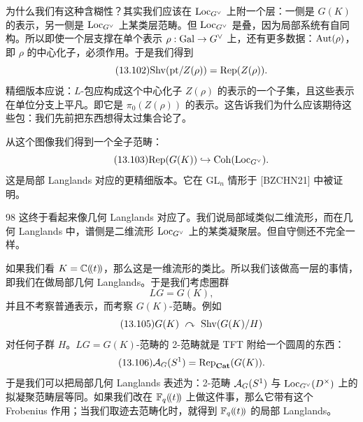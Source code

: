 为什么我们有这种含糊性？其实我们应该在 $\mathrm{Loc}_{G^\vee}$ 上附一个层：一侧是 $G(K)$ 的表示，另一侧是 $\mathrm{Loc}_{G^\vee}$ 上某类层范畴。但 $\mathrm{Loc}_{G^\vee}$ 是叠，因为局部系统有自同构。所以即使一个层支撑在单个表示 $\rho:\mathrm{Gal}\to G^\vee$ 上，还有更多数据：$\mathrm{Aut}(\rho)$，即 $\rho$ 的中心化子，必须作用。于是我们得到
\begin{equation}\tag{13.102}
\mathrm{Shv}(\mathrm{pt}/Z(\rho))=\mathrm{Rep}(Z(\rho)).
\end{equation}
精细版本应说：$L$-包应构成这个中心化子 $Z(\rho)$ 的表示的一个子集，且这些表示在单位分支上平凡。即它是 $\pi_0(Z(\rho))$ 的表示。这告诉我们为什么应该期待这些包：我们先前把东西想得太过集合论了。

从这个图像我们得到一个全子范畴：
\begin{equation}\tag{13.103}
\mathrm{Rep}(G(K))\hookrightarrow \mathrm{Coh}(\mathrm{Loc}_{G^\vee}).
\end{equation}
这是局部 Langlands 对应的更精细版本。它在 $\mathrm{GL}_n$ 情形于 [BZCHN21] 中被证明。

\begin{srcrem}{98}
这终于看起来像几何 Langlands 对应了。我们说局部域类似二维流形，而在几何 Langlands 中，谱侧是二维流形 $\mathrm{Loc}_{G^\vee}$ 上的某类凝聚层。但自守侧还不完全一样。
\end{srcrem}

如果我们看 $K=\mathbb{C}(\!(t)\!)$，那么这是一维流形的类比。所以我们该做高一层的事情，即我们在做局部几何 Langlands。于是我们考虑圈群
\begin{equation}\tag{13.104}
LG=G(K),
\end{equation}
并且不考察普通表示，而考察 $G(K)$-范畴。例如
\begin{equation}\tag{13.105}
G(K)\ \curvearrowright\ \mathrm{Shv}(G(K)/H)
\end{equation}
对任何子群 $H$。$LG=G(K)$-范畴的 2-范畴就是 TFT 附给一个圆周的东西：
\begin{equation}\tag{13.106}
\mathcal{A}_G(S^1)=\mathrm{Rep}_{\mathbf{Cat}}(G(K)).
\end{equation}
于是我们可以把局部几何 Langlands 表述为：2-范畴 $\mathcal{A}_G(S^1)$ 与 $\mathrm{Loc}_{G^\vee}(D^\times)$ 上的拟凝聚范畴层等同。如果我们改在 $\mathbb{F}_q(\!(t)\!)$ 上做这件事，那么它带有这个 Frobenius 作用；当我们取迹去范畴化时，就得到 $\mathbb{F}_q(\!(t)\!)$ 的局部 Langlands。

